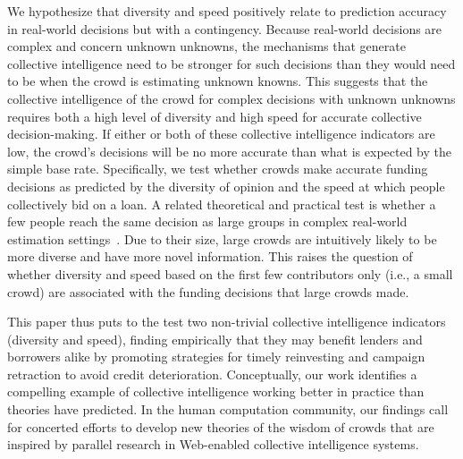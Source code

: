 \documentclass[sigconf]{acmart}
\begin{document}
We hypothesize that diversity and speed positively relate to prediction accuracy in real-world decisions but with a contingency. Because real-world decisions are complex and concern unknown unknowns, the mechanisms that generate collective intelligence need to be stronger for such decisions than they would need to be when the crowd is estimating unknown knowns. This suggests that the collective intelligence of the crowd for complex decisions with unknown unknowns requires both a high level of diversity and high speed for accurate collective decision-making. If either or both of these collective intelligence indicators are low, the crowd's decisions will be no more accurate than what is expected by the simple base rate. Specifically, we test whether crowds make accurate funding decisions as predicted by the diversity of opinion and the speed at which people collectively bid on a loan. A related theoretical and practical test is whether a few people reach the same decision as large groups in complex real-world estimation settings~\cite{navajas2018aggregated}. Due to their size, large crowds are intuitively likely to be more diverse and have more novel information. This raises the question of whether diversity and speed based on the first few contributors only (i.e., a small crowd) are associated with the funding decisions that large crowds made.

This paper thus puts to the test two non-trivial collective intelligence indicators (diversity and speed), finding empirically that they may benefit lenders and borrowers alike by promoting strategies for timely reinvesting and campaign retraction to avoid credit deterioration. Conceptually, our work identifies a compelling example of collective intelligence working better in practice than theories have predicted. In the human computation community, our findings call for concerted efforts to develop new theories of the wisdom of crowds that are inspired by parallel research in Web-enabled collective intelligence systems.
\end{document}
